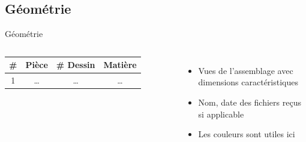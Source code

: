 \subsection{Géométrie}
\label{sec:Géométrie}

\begin{frame}[c]{Géométrie}
  \begin{columns}
    \begin{tabular}{cccc}
      \toprule
      \# & Pièce & \# Dessin & Matière \\
      \midrule
      1 & \ldots & \ldots & \ldots \\
      \bottomrule
    \end{tabular}
    
    \begin{itemize}
    \item Vues de l'assemblage avec dimensions caractéristiques
    \item Nom, date des fichiers reçus si applicable
    \item Les couleurs sont utiles ici
    \end{itemize}
  \end{columns}
\end{frame}